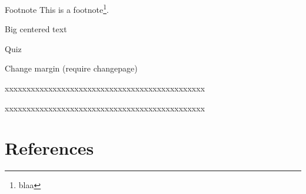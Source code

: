 \documentclass[table]{beamer}
\begin{document}
\begin{frame}[label={sec:org0db9721}]{Footnote}
This is a footnote\footnote{blaa}.
\end{frame}
\begin{frame}[label={sec:org33ef0de}]{Big centered text}
\vfill

\begin{center}
\Huge Quiz
\end{center}

\vfill
\end{frame}

\begin{frame}[label={sec:orgf0d3e2f}]{Change margin}
(require changepage)
\begin{adjustwidth}{-1em}{-1em}
xxxxxxxxxxxxxxxxxxxxxxxxxxxxxxxxxxxxxxxxxxxxxx
\end{adjustwidth}
\begin{adjustwidth}{-3em}{-3em}
xxxxxxxxxxxxxxxxxxxxxxxxxxxxxxxxxxxxxxxxxxxxxx
\end{adjustwidth}
\end{frame}

\section{References}
\label{sec:org677b369}
\begingroup
\renewcommand{\section}[2]{}



\endgroup
\end{document}
